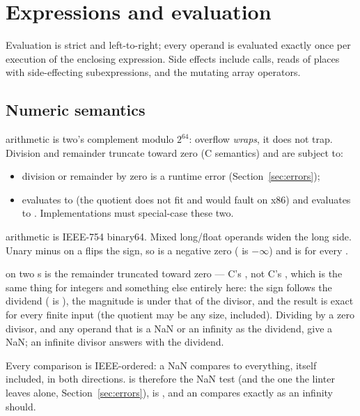 \section{Expressions and evaluation}
\label{sec:evaluation}

Evaluation is strict and left-to-right; every operand is evaluated
exactly once per execution of the enclosing expression. Side effects
include calls, reads of places with side-effecting subexpressions, and
the mutating array operators.

\subsection{Numeric semantics}

 arithmetic is two's complement modulo $2^{64}$: overflow
\emph{wraps}, it does not trap. Division and remainder truncate toward
zero (C semantics) and are subject to:

\begin{itemize}[nosep]
\item division or remainder by zero is a runtime error
  (Section~\ref{sec:errors});
\item {} evaluates to  (the quotient does
  not fit and would fault on x86) and  evaluates to
  . Implementations must special-case these two.
\end{itemize}

 arithmetic is IEEE-754 binary64. Mixed long/float operands
widen the long side. Unary minus on a  flips the sign, so
 is a negative zero ( is $-\infty$) and
 is  for every .

\ic{\%} on two s is the remainder truncated toward zero ---
C's , not C's \ic{\%}, which is the same thing for integers
and something else entirely here: the sign follows the dividend
( is ), the magnitude is under that of the
divisor, and the result is exact for every finite input (the quotient
may be any size,  included). Dividing by a zero
divisor, and any operand that is a NaN or an infinity as the dividend,
give a NaN; an infinite divisor answers with the dividend.

Every comparison is IEEE-ordered: a NaN compares  to
everything, itself included, in both directions.  is
therefore the NaN test (and the one the linter leaves alone,
Section~\ref{sec:errors}), \ic{[nan] == [1.0]} is , and an
 compares exactly as an infinity should.

